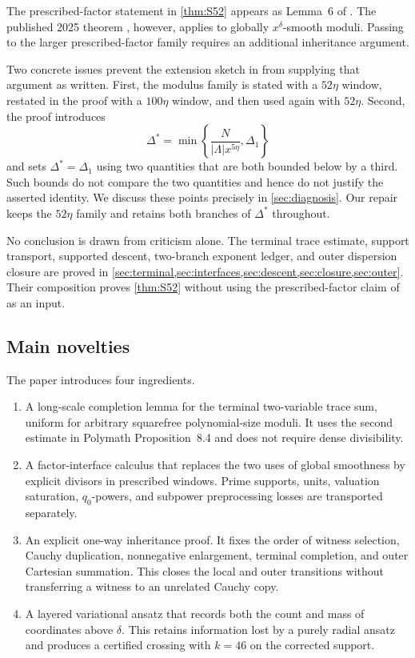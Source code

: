 The prescribed-factor statement in \cref{thm:S52} appears as Lemma~6 of
\cite[version~1, p.~12]{Stadlmann2026}.  The published 2025 theorem
\cite{Stadlmann2025}, however, applies to globally $x^\delta$-smooth moduli.
Passing to the larger prescribed-factor family requires an additional
inheritance argument.

Two concrete issues prevent the extension sketch in
\cite[version~1, pp.~12, 17--18]{Stadlmann2026} from supplying that argument
as written.  First, the modulus family is stated with a $52\eta$ window,
restated in the proof with a $100\eta$ window, and then used again with
$52\eta$.  Second, the proof introduces
\[
 \Delta^*=\min\left\{\frac{N}{|\Lambda|x^{5\eta}},\Delta_1\right\}
\]
and sets $\Delta^*=\Delta_1$ using two quantities that are both bounded
below by a third.  Such bounds do not compare the two quantities and hence do
not justify the asserted identity.  We discuss these points precisely in
\cref{sec:diagnosis}.  Our repair keeps the $52\eta$ family and retains both
branches of $\Delta^*$ throughout.

No conclusion is drawn from criticism alone.  The terminal trace estimate,
support transport, supported descent, two-branch exponent ledger, and outer
dispersion closure are proved in
\cref{sec:terminal,sec:interfaces,sec:descent,sec:closure,sec:outer}.  Their
composition proves \cref{thm:S52} without using the prescribed-factor claim
of \cite{Stadlmann2026} as an input.

\subsection{Main novelties}

The paper introduces four ingredients.
\begin{enumerate}[label=\textup{(\roman*)}]
\item A long-scale completion lemma for the terminal two-variable trace sum,
uniform for arbitrary squarefree polynomial-size moduli.  It uses the second
estimate in Polymath Proposition~8.4 and does not require dense divisibility.
\item A factor-interface calculus that replaces the two uses of global
smoothness by explicit divisors in prescribed windows.  Prime supports,
units, valuation saturation, $q_0$-powers, and subpower preprocessing losses
are transported separately.
\item An explicit one-way inheritance proof.  It fixes the order of witness
selection, Cauchy duplication, nonnegative enlargement, terminal completion,
and outer Cartesian summation.  This closes the local and outer transitions
without transferring a witness to an unrelated Cauchy copy.
\item A layered variational ansatz that records both the count and mass of
coordinates above $\delta$.  This retains information lost by a purely
radial ansatz and produces a certified crossing with $k=46$ on the corrected
support.
\end{enumerate}

